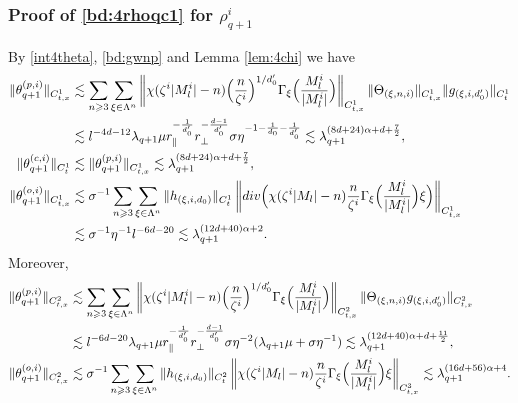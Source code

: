 \documentclass[10pt,a4paper]{amsart}
\numberwithin{equation}{section}
\def\({{\Big(}}
\def\){{\Big)}}
\newcommand{\norm}[1]{\left\|#1\right\|}
\def\geq{\geqslant}
\def\div{\mathord{{\rm div}}}
\def\({{\Big(}}
\def\){{\Big)}}
\def\geq{\geqslant}
\def\div{\mathord{{\rm div}}}
\begin{document}
\subsubsection{Proof of  \eqref{bd:4rhoqc1} for $\rho^{i}_{q+1}$}
  By \eqref{int4theta}, \eqref{bd:gwnp} and Lemma \ref{lem:4chi} we have
\begin{align*}
\|\theta_{q+1}^{(p,i)} \|_{C_{t,x}^1} 
&\lesssim\sum_{n\geq3}\sum_{\xi\in\Lambda^{n}}\norm{\chi(\zeta^{i}|M^{i}_l|-n)\(\frac{n}{\zeta^{i}}\)^{1/d_0'}\Gamma_{\xi}\(\frac{M^{i}_l}{|M^{i}_l|}\)}_{C_{t,x}^1}\|\Theta_{(\xi,n,i)} \|_{C_{t,x}^1}\|g_{(\xi,i,d_0')}\|_{C_t^1}\notag\\ 
&\lesssim l^{-4d-12}\lambda_{q+1}\mu r_\parallel^{-\frac{1}{d_0'}}r_\perp^{-\frac{d-1}{d_0'}}\sigma\eta^{-1-\frac{1}{d_0}-\frac{1}{d_0'}}\lesssim
\lambda_{q+1}^{(8d+24)\alpha+d+\frac{7}{2}},\notag\\
\|\theta_{q+1}^{(c,i)}\|_{C_{t}^1}&\lesssim\|\theta_{q+1}^{(p,i)} \|_{C_{t,x}^1}\lesssim 
\lambda_{q+1}^{(8d+24)\alpha+d+\frac{7}{2}},\notag\\
     \|   \theta_{q+1}^{(o,i)}\|_{C_{t,x}^1}&\lesssim \sigma^{-1}\sum_{n\geq3}\sum_{\xi\in\Lambda^{n}}\|h_{(\xi,i,d_0)}\|_{C_t^1}\norm{\div\(\chi(\zeta^i|M_l|-n)\frac{n}{\zeta^i}\Gamma_{\xi}\(\frac{M_l^i}{|M_l^i|}\)\xi\)}_{C_{t,x}^1}\\ 
     &\lesssim \sigma^{-1}\eta^{-1} l^{-6d-20}\lesssim \lambda_{q+1}^{(12d+40)\alpha+2}.\notag
\end{align*}
Moreover, 
\begin{align*}
    \|\theta_{q+1}^{(p,i)} \|_{C_{t,x}^2}
&\lesssim\sum_{n\geq3}\sum_{\xi\in\Lambda^{n}}\norm{\chi(\zeta^{i}|M^{i}_l|-n)\(\frac{n}{\zeta^{i}}\)^{1/d_0'}\Gamma_{\xi}\(\frac{M^{i}_l}{|M^{i}_l|}\)}_{C_{t,x}^2}\| \Theta_{(\xi,n,i)} g_{(\xi,i,d_0')}\|_{C_{t,x}^2}\notag\\ 
&\lesssim l^{-6d-20}\lambda_{q+1}\mu r_\parallel^{-\frac{1}{d_0'}}r_\perp^{-\frac{d-1}{d_0'}}\sigma\eta^{-2}(\lambda_{q+1}\mu+\sigma\eta^{-1})\lesssim
\lambda_{q+1}^{(12d+40)\alpha+d+\frac{11}{2}},\notag\\
   \|    \theta_{q+1}^{(o,i)}\|_{C_{t,x}^2}&\lesssim \sigma^{-1}\sum_{n\geq3}\sum_{\xi\in\Lambda^{n}}\|h_{(\xi,i,d_0)}\|_{C_t^2}\norm{\chi(\zeta^i|M_l|-n)\frac{n}{\zeta^i}\Gamma_{\xi}\(\frac{M_l^i}{|M_l^i|}\)\xi}_{C_{t,x}^3}
       \lesssim \lambda_{q+1}^{(16d+56)\alpha+4}.\notag
\end{align*}
\end{document}
